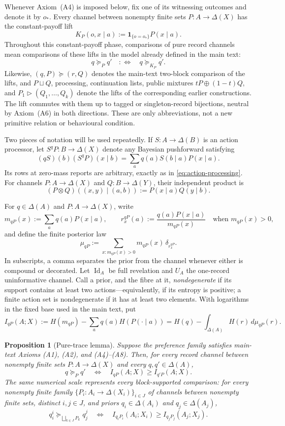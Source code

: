 \documentclass[11pt,a4paper]{article}
\newtheorem{proposition}[theorem]{Proposition}
\theoremstyle{definition}
\newcommand{\D}{\Delta}
\newcommand{\Sh}{H}
\newcommand{\Id}{\operatorname{Id}}
\newcommand{\1}{\mathbf 1}
\begin{document}
Whenever Axiom~\textup{(A4)} is imposed below, fix one of its witnessing
outcomes and denote it by $o_\ast$.  Every channel between nonempty finite sets
$P:A\to\D(X)$ has the constant-payoff lift
\begin{equation}
K_P(o,x\mid a):=\1_{\{o=o_\ast\}}P(x\mid a).
\label{pt:eq:constant-payoff-lift}
\end{equation}
Throughout this constant-payoff phase, comparisons of pure record channels mean comparisons
of these lifts in the model already defined in the main text:
\[
q\succeq_Pq'\quad:\Longleftrightarrow\quad q\succeq_{K_P}q'.
\]
Likewise, $(q,P)\succeq(r,Q)$ denotes the main-text two-block comparison of
the lifts, and $P\sqcup Q$, processing, continuation lists, public mixtures
$tP\oplus(1-t)Q$, and $P_1\triangleright(Q_1,\ldots,Q_k)$ denote the lifts of
the corresponding earlier constructions.
The lift commutes with them up to tagged or singleton-record bijections,
neutral by Axiom~\textup{(A6)} in both directions.  These are only
abbreviations, not a new primitive relation or behavioural condition.

Two pieces of notation will be used repeatedly.  If
$S:A\to\Delta(B)$ is an action processor, let $S^qP:B\to\Delta(X)$ denote any
Bayesian pushforward satisfying
\[
 (qS)(b)(S^qP)(x\mid b)
 =\sum_a q(a)S(b\mid a)P(x\mid a).
\]
Its rows at zero-mass reports are arbitrary, exactly as in
\eqref{eq:action-processing}.  For channels $P:A\to\Delta(X)$ and
$Q:B\to\Delta(Y)$, their independent product is
\[
 (P\otimes Q)((x,y)\mid(a,b)):=P(x\mid a)Q(y\mid b).
\]

For $q\in\D(A)$ and $P:A\to\D(X)$, write
\[
m_{qP}(x):=\sum_a q(a)P(x\mid a),
\qquad
r_x^{qP}(a):=\frac{q(a)P(x\mid a)}{m_{qP}(x)}
\quad\text{when }m_{qP}(x)>0,
\]
and define the finite posterior law
\[
\mu_{qP}:=
\sum_{x:m_{qP}(x)>0}m_{qP}(x)\,\delta_{r_x^{qP}}.
\]
In subscripts, a comma separates the prior from the channel whenever either
is compound or decorated.
Let $\Id_A$ be full revelation and $U_A$ the one-record uninformative
channel.  Call a prior, and the fibre at it, \emph{nondegenerate} if its
support contains at least two actions---equivalently, if its entropy is
positive; a finite action set is nondegenerate if it has at least two
elements.  With logarithms in the fixed base used in the main text, put
\[
I_{qP}(A;X)
:=\Sh(m_{qP})-\sum_a q(a)\Sh(P(\cdot\mid a))
=\Sh(q)-\int_{\D(A)}\Sh(r)\,d\mu_{qP}(r).
\]

\begin{proposition}[Pure-trace lemma]\label{pt:prop:main}
Suppose the preference family satisfies main-text Axioms
\textup{(A1)}, \textup{(A2)}, and \textup{(A4)--(A8)}.  Then, for every record channel between
nonempty finite sets
$P:A\to\D(X)$ and every $q,q'\in\D(A)$,
\[
q\succeq_Pq'
\quad\Longleftrightarrow\quad
I_{qP}(A;X)\ge I_{q'P}(A;X).
\]
The same numerical scale represents every block-supported comparison: for
every nonempty finite family $\{P_i:A_i\to\D(X_i)\}_{i\in J}$ of channels
between nonempty finite sets, distinct $i,j\in J$,
and priors $q_i\in\D(A_i)$ and $q_j\in\D(A_j)$,
\[
q_i^i\succeq_{\bigsqcup_{k\in J}P_k}q_j^j
\quad\Longleftrightarrow\quad
I_{q_iP_i}(A_i;X_i)\ge I_{q_jP_j}(A_j;X_j).
\]
\end{proposition}
\end{document}
